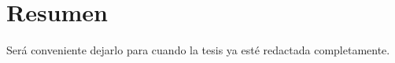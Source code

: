 \documentclass[a4paper,openright,12pt]{report}
\begin{document}
\chapter*{Resumen} %

Será conveniente dejarlo para cuando la tesis ya esté redactada completamente.


\tableofcontents %


\cleardoublepage
{} %
\listoffigures %


\cleardoublepage
{} %
\listoftables %
\end{document}
